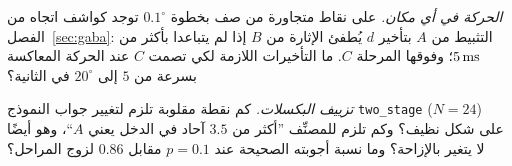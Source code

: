 \begin{exercise}[\lvlB]
\label{ex:12:7}
\emph{الحركة في أي مكان.} على نقاط متجاورة من صف بخطوة $0.1^\circ$ توجد كواشف اتجاه من الفصل~\ref{sec:gaba}: التثبيط من $A$ بتأخير $d$ يُطفئ الإثارة من $B$ إذا لم يتباعدا بأكثر من $5\,\text{ms}$؛ وفوقها المرحلة $C$. ما التأخيرات اللازمة لكي تصمت $C$ عند الحركة المعاكسة بسرعة من $5$ إلى $20^\circ$ في الثانية؟
\end{exercise}

\begin{exercise}[\lvlC]
\label{ex:12:8}
\emph{تزييف البكسلات.} كم نقطة مقلوبة تلزم لتغيير جواب النموذج \foreignlanguage{english}{\texttt{two\_stage}} ($N=24$) على شكل نظيف؟ وكم تلزم للمصنِّف ”أكثر من $3.5$ آحاد في الدخل يعني $A$“، وهو أيضًا لا يتغير بالإزاحة؟ وما نسبة أجوبته الصحيحة عند $p=0.1$ مقابل $0.86$ لزوج المراحل؟
\end{exercise}
